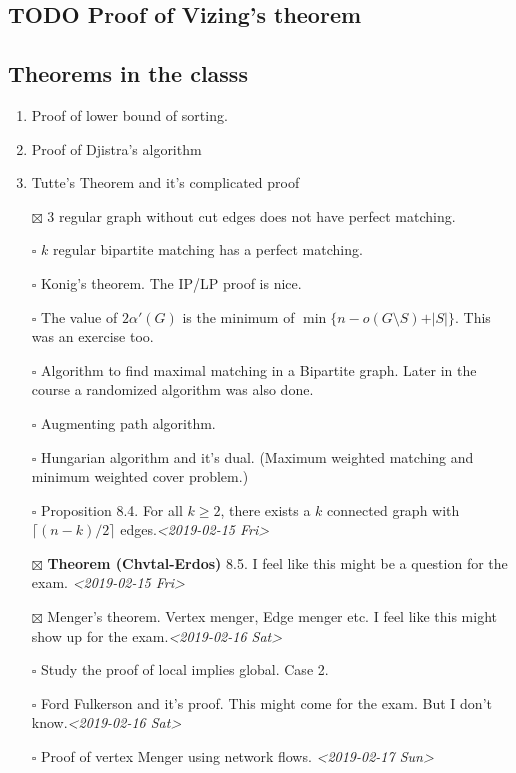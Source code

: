 \documentclass[11pt]{article}
\def\min{\operatorname{min}}
\begin{document}
\subsection{{\bfseries\sffamily TODO} Proof of Vizing's theorem}
\label{sec:orgf91bff0}
\subsection{Theorems in the classs}
\label{sec:orgd27af48}
\begin{enumerate}
\item Proof of lower bound of sorting.
\item Proof of Djistra's algorithm
\item Tutte's Theorem and it's complicated proof
\item[{$\boxtimes$}] 3 regular graph without cut edges does not have perfect matching.
\item[{$\square$}] \(k\) regular bipartite matching has a perfect matching.
\item[{$\square$}] Konig's theorem. The IP/LP proof is nice.
\item[{$\square$}] The value of \(2\alpha'(G)\) is the minimum of \(\min\{n - o(G\setminus
      S) + \vert S \vert\}\). This was an exercise too.
\item[{$\square$}] Algorithm to find maximal matching in a Bipartite graph. Later in the
course a randomized algorithm was also done.
\item[{$\square$}] Augmenting path algorithm.
\item[{$\square$}] Hungarian algorithm and it's dual. (Maximum weighted matching and
minimum weighted cover problem.)
\item[{$\square$}] Proposition 8.4. For all \(k \ge 2\), there exists a \(k\) connected graph
with \(\lceil (n-k)/2 \rceil\) edges.\textit{<2019-02-15 Fri>}
\item[{$\boxtimes$}] \textbf{Theorem (Chvtal-Erdos)} 8.5. I feel like this might be a question for
the exam. \textit{<2019-02-15 Fri>}
\item[{$\boxtimes$}] Menger's theorem. Vertex menger, Edge menger etc. I feel like this
might show up for the exam.\textit{<2019-02-16 Sat>}
\item[{$\square$}] Study the proof of local implies global. Case 2.
\item[{$\square$}] Ford Fulkerson and it's proof. This might come for the exam. But I
don't know.\textit{<2019-02-16 Sat>}
\item[{$\square$}] Proof of vertex Menger using network flows. \textit{<2019-02-17 Sun>}

\end{enumerate}
\end{document}
